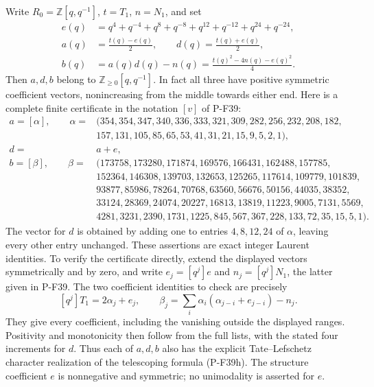 Write $R_0=\mathbb Z[q,q^{-1}]$, $t=T_1$, $n=N_1$, and set
\[
 \begin{split}
 e(q)&=q^4+q^{-4}+q^8+q^{-8}
                    +q^{12}+q^{-12}+q^{24}+q^{-24},\\
 a(q)&=\frac{t(q)-e(q)}2,\qquad
 d(q)=\frac{t(q)+e(q)}2,\\
 b(q)&=a(q)d(q)-n(q)
       =\frac{t(q)^2-4n(q)-e(q)^2}{4}.
 \end{split}                                                    \tag{P-F52y}
\]
Then $a,d,b$ belong to $\mathbb Z_{\ge0}[q,q^{-1}]$.
In fact all three have positive symmetric coefficient vectors,
nonincreasing from the middle towards either end. Here is a
complete finite certificate in the notation $[v]$ of P-F39:
\[
 \begin{split}
 a=[\alpha],\qquad \alpha={}&
 (354,354,347,340,336,333,321,309,282,256,232,208,182,\\
 &157,131,105,85,65,53,41,31,21,15,9,5,2,1),\\
 d={}&a+e,\\
 b=[\beta],\qquad \beta={}&
 (173758,173280,171874,169576,166431,162488,157785,\\
 &152364,146308,139703,132653,125265,117614,109779,101839,\\
 &93877,85986,78264,70768,63560,56676,50156,44035,38352,\\
 &33124,28369,24074,20227,16813,13819,11223,9005,7131,5569,\\
 &4281,3231,2390,1731,1225,845,567,367,228,133,72,35,15,5,1).
 \end{split}                                                    \tag{P-F52z}
\]
The vector for $d$ is obtained by adding one to entries
$4,8,12,24$ of $\alpha$, leaving every other entry unchanged.
These assertions are exact integer Laurent identities. To verify
the certificate directly, extend the displayed vectors
symmetrically and by zero, and write $e_j=[q^j]e$ and
$n_j=[q^j]N_1$, the latter given in P-F39. The two coefficient
identities to check are precisely
\[
 [q^j]T_1=2\alpha_j+e_j,\qquad
 \beta_j=\sum_i\alpha_i(\alpha_{j-i}+e_{j-i})-n_j.
                                                               \tag{P-F52aa}
\]
They give every coefficient, including the vanishing outside
the displayed ranges. Positivity and monotonicity then follow
from the full lists, with the stated four increments for $d$.
Thus each of $a,d,b$ also has the explicit Tate--Lefschetz
character realization of the telescoping formula (P-F39h).
The structure coefficient $e$ is nonnegative and symmetric;
no unimodality is asserted for $e$.

